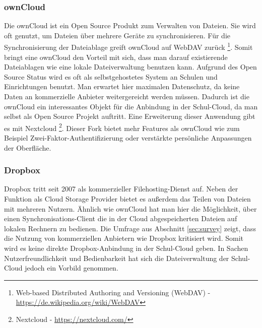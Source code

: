 \subsubsection{ownCloud}

Die ownCloud ist ein Open Source Produkt zum Verwalten von Dateien. Sie wird oft genutzt, um Dateien über mehrere Geräte zu synchronisieren. Für die Synchronisierung der Dateiablage greift ownCloud auf WebDAV zurück \footnote{Web-based Distributed Authoring and Versioning (WebDAV) - \url{https://de.wikipedia.org/wiki/WebDAV}}. Somit bringt eine ownCloud den Vorteil mit sich, dass man darauf existierende Dateiablagen wie eine lokale Dateiverwaltung benutzen kann. Aufgrund des Open Source Status wird es oft als selbstgehostetes System an Schulen und Einrichtungen benutzt. Man erwartet hier maximalen Datenschutz, da keine Daten an kommerzielle Anbieter weitergereicht werden müssen. Dadurch ist die ownCloud ein interessantes Objekt für die Anbindung in der Schul-Cloud, da man selbst als Open Source Projekt auftritt. Eine Erweiterung dieser Anwendung gibt es mit Nextcloud \footnote{Nextcloud - \url{https://nextcloud.com/}}. Dieser Fork bietet mehr Features als ownCloud wie zum Beispiel Zwei-Faktor-Authentifizierung oder verstärkte persönliche Anpassungen der Oberfläche.

\subsubsection{Dropbox}

Dropbox tritt seit 2007 als kommerzieller Filehosting-Dienst auf. Neben der Funktion als Cloud Storage Provider bietet es außerdem das Teilen von Dateien mit mehreren Nutzern. Ähnlich wie ownCloud hat man hier die Möglichkeit, über einen Synchronisations-Client die in der Cloud abgespeicherten Dateien auf lokalen Rechnern zu bedienen. Die Umfrage aus Abschnitt \ref{sec:survey} zeigt, dass die Nutzung von kommerziellen Anbietern wie Dropbox kritisiert wird. Somit wird es keine direkte Dropbox-Anbindung in der Schul-Cloud geben. In Sachen Nutzerfreundlichkeit und Bedienbarkeit hat sich die Dateiverwaltung der Schul-Cloud jedoch ein Vorbild genommen. 

\clearpage
